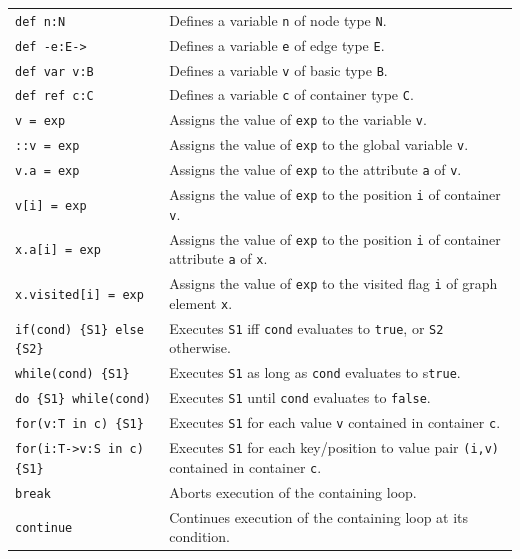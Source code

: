 \begin{table}[htbp]
\begin{minipage}{\linewidth} \renewcommand{\footnoterule}{} 
\begin{tabularx}{\linewidth}{|lX|}
\hline
\texttt{def n:N}	& Defines a variable \texttt{n} of node type \texttt{N}.\\
\texttt{def -e:E->}	& Defines a variable \texttt{e} of edge type \texttt{E}.\\
\texttt{def var v:B}	& Defines a variable \texttt{v} of basic type \texttt{B}.\\
\texttt{def ref c:C}	& Defines a variable \texttt{c} of container type \texttt{C}.\\
\hline
\texttt{v = exp} & Assigns the value of \texttt{exp} to the variable \texttt{v}.\\
\texttt{::v = exp} & Assigns the value of \texttt{exp} to the global variable \texttt{v}.\\
\texttt{v.a = exp} & Assigns the value of \texttt{exp} to the attribute \texttt{a} of \texttt{v}.\\
\texttt{v[i] = exp} & Assigns the value of \texttt{exp} to the position \texttt{i} of container \texttt{v}.\\
\texttt{x.a[i] = exp} & Assigns the value of \texttt{exp} to the position \texttt{i} of container attribute \texttt{a} of \texttt{x}.\\
\texttt{x.visited[i] = exp} & Assigns the value of \texttt{exp} to the visited flag \texttt{i} of graph element \texttt{x}.\\
\hline
\texttt{if(cond) \{S1\} else \{S2\}} & Executes \texttt{S1} iff \texttt{cond} evaluates to \texttt{true}, or \texttt{S2} otherwise.\\
\texttt{while(cond) \{S1\} } & Executes \texttt{S1} as long as \texttt{cond} evaluates to s\texttt{true}.\\
\texttt{do \{S1\} while(cond) } & Executes \texttt{S1} until \texttt{cond} evaluates to \texttt{false}.\\
\texttt{for(v:T in c) \{S1\} } & Executes \texttt{S1} for each value \texttt{v} contained in container \texttt{c}.\\
\texttt{for(i:T->v:S in c) \{S1\} } & Executes \texttt{S1} for each key/position to value pair \texttt{(i,v)} contained in container \texttt{c}.\\
\hline
\texttt{break} & Aborts execution of the containing loop.\\
\texttt{continue} & Continues execution of the containing loop at its condition.\\

\end{tabularx}
\end{minipage}
\end{table}
